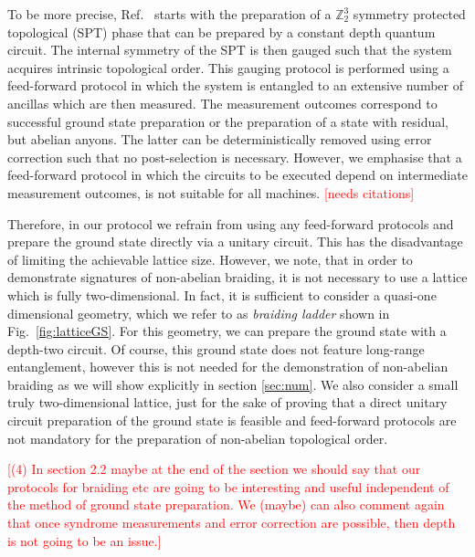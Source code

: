 \documentclass[two column]{article}
\newcommand{\caro}[1]{\textcolor{red}{[#1]}}
\begin{document}
To be more precise, Ref.~\cite{iqbal2023creation} starts with the preparation of a $\mathbb Z_2^3$ symmetry protected topological (SPT) phase that can be prepared by a constant depth quantum circuit. The internal symmetry of the SPT is then gauged such that the system acquires intrinsic topological order. This gauging protocol is performed using a feed-forward protocol in which the system is entangled to an extensive number of ancillas which are then measured. The measurement outcomes correspond to successful ground state preparation or the preparation of a state with residual, but abelian anyons. The latter can be deterministically removed using error correction such that no post-selection is necessary. However, we emphasise that a feed-forward protocol in which the circuits to be executed depend on intermediate measurement outcomes, is not suitable for all machines. \caro{needs citations} 

Therefore, in our protocol we refrain from using any feed-forward protocols and prepare the ground state directly via a unitary circuit. This has the disadvantage of limiting the achievable lattice size. However, we note, that in order to demonstrate signatures of non-abelian braiding, it is not necessary to use a lattice which is fully two-dimensional. In fact, it is sufficient to consider a quasi-one dimensional geometry, which we refer to as \emph{braiding ladder} shown in Fig.~\ref{fig:latticeGS}. For this geometry, we can prepare the ground state with a depth-two circuit. Of course, this ground state does not feature long-range entanglement, however this is not needed for the demonstration of non-abelian braiding as we will show explicitly in section \ref{sec:num}. We also consider a small truly two-dimensional lattice, just for the sake of proving that a direct unitary circuit preparation of the ground state is feasible and feed-forward protocols are not mandatory for the preparation of non-abelian topological order.

\caro{(4) In section 2.2 maybe at the end of the section we should say that our protocols for braiding etc are going to be interesting and useful independent of the method of ground state preparation.    We (maybe) can also comment again that once syndrome measurements and error correction are possible, then depth is not going to be an issue.}
\end{document}
